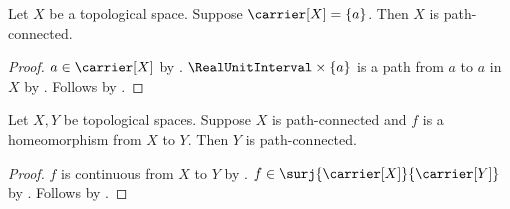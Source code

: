 \begin{theorem}\label{singleton_space_is_path_connected}
    Let $X$ be a topological space.
    Suppose $\carrier[X]=\{a\}$.
    Then $X$ is path-connected.
\end{theorem}
\begin{proof}
    $a\in\carrier[X]$ by .
    $\RealUnitInterval\times\{a\}$ is a path from $a$ to $a$ in $X$ by
        .
    Follows by .
\end{proof}

\begin{theorem}\label{homeomorphism_preserves_path_connectedness}
    Let $X,Y$ be topological spaces.
    Suppose $X$ is path-connected and $f$ is a homeomorphism from $X$ to $Y$.
    Then $Y$ is path-connected.
\end{theorem}
\begin{proof}
    $f$ is continuous from $X$ to $Y$ by .
    $f\in\surj{\carrier[X]}{\carrier[Y]}$ by .
    Follows by .
\end{proof}
